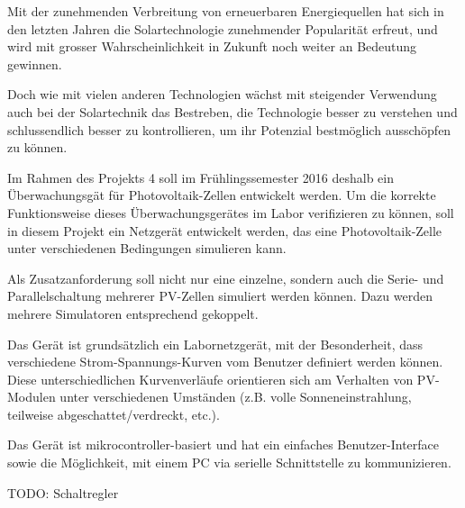 Mit der  zunehmenden Verbreitung von  erneuerbaren Energiequellen hat  sich in
den letzten Jahren die Solartechnologie zunehmender Popularit\"at erfreut, und
wird  mit  grosser Wahrscheinlichkeit  in  Zukunft  noch weiter  an  Bedeutung
gewinnen.

Doch wie  mit vielen anderen  Technologien w\"achst mit  steigender Verwendung
auch bei der  Solartechnik das Bestreben, die Technologie  besser zu verstehen
und  schlussendlich besser  zu kontrollieren,  um ihr  Potenzial bestm\"oglich
aussch\"opfen zu k\"onnen.

Im  Rahmen  des  Projekts  4  soll im  Fr\"uhlingssemester  2016  deshalb  ein
\"Uberwachungsg\"at  f\"ur   Photovoltaik-Zellen  entwickelt   werden. Um  die
korrekte Funktionsweise  dieses \"Uberwachungsger\"ates im  Labor verifizieren
zu k\"onnen,  soll in  diesem Projekt ein  Netzger\"at entwickelt  werden, das
eine Photovoltaik-Zelle unter verschiedenen Bedingungen simulieren kann.

Als Zusatzanforderung  soll nicht nur  eine einzelne, sondern auch  die Serie-
und  Parallelschaltung  mehrerer  PV-Zellen  simuliert  werden  k\"onnen. Dazu
werden mehrere Simulatoren entsprechend gekoppelt.

Das Ger\"at  ist grunds\"atzlich  ein Labornetzger\"at, mit  der Besonderheit,
dass  verschiedene   Strom-Spannungs-Kurven  vom  Benutzer   definiert  werden
k\"onnen. Diese   unterschiedlichen  Kurvenverl\"aufe   orientieren  sich   am
Verhalten  von   PV-Modulen  unter   verschiedenen  Umst\"anden   (z.B.  volle
Sonneneinstrahlung, teilweise abgeschattet/verdreckt, etc.).

Das   Ger\"at    ist   mikrocontroller-basiert    und   hat    ein   einfaches
Benutzer-Interface  sowie  die  M\"oglichkeit,   mit  einem  PC  via  serielle
Schnittstelle zu kommunizieren.


TODO: Schaltregler
